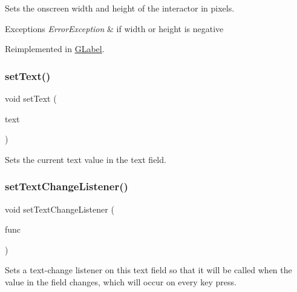 Sets the onscreen width and height of the interactor in pixels. 


\begin{DoxyExceptions}{Exceptions}
{\em Error\+Exception} & if width or height is negative \\
\hline
\end{DoxyExceptions}


Reimplemented in \mbox{\hyperlink{classGLabel_a42d96e60c62d7770993327d7147d77b8}{G\+Label}}.

\mbox{\label{classGTextField_ac1ae51949d41ee9054634be5967d91b8}} 
\subsubsection{\texorpdfstring{set\+Text()}{setText()}}
{\footnotesize\ttfamily void set\+Text (\begin{DoxyParamCaption}\item[{const std\+::string \&}]{text }\end{DoxyParamCaption})\hspace{0.3cm}{\ttfamily [virtual]}}



Sets the current text value in the text field. 

\mbox{\label{classGTextField_ae41284f9c540110180ac0ad6beca5cb0}} 
\subsubsection{\texorpdfstring{set\+Text\+Change\+Listener()}{setTextChangeListener()}\hspace{0.1cm}{\footnotesize\ttfamily [1/2]}}
{\footnotesize\ttfamily void set\+Text\+Change\+Listener (\begin{DoxyParamCaption}\item[{G\+Event\+Listener}]{func }\end{DoxyParamCaption})\hspace{0.3cm}{\ttfamily [virtual]}}



Sets a text-\/change listener on this text field so that it will be called when the value in the field changes, which will occur on every key press. 

